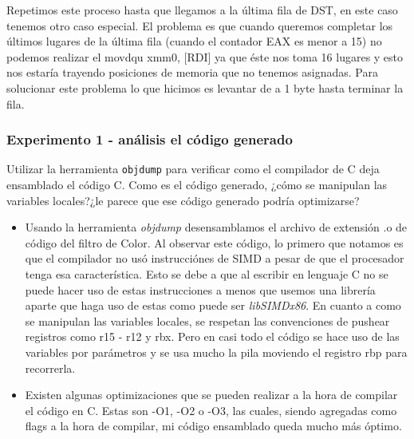 Repetimos este proceso hasta que llegamos a la última fila de DST, en este caso tenemos otro caso especial. \newline
El problema es que cuando queremos completar los últimos lugares de la última fila (cuando el contador EAX es menor a 15)
no podemos realizar el movdqu xmm0, [RDI] ya que éste nos toma 16 lugares y esto nos estaría trayendo posiciones de memoria
que no tenemos asignadas. Para solucionar este problema lo que hicimos es levantar de a 1 byte hasta terminar la fila. \newline


\vspace*{0.3cm} \noindent
\subsubsection{Experimento 1 - análisis el código generado}

Utilizar la herramienta \verb|objdump| para verificar como el compilador de C deja ensamblado el código C. Como es el código generado, ¿cómo se manipulan las variables locales?¿le parece que ese código generado podría optimizarse?
\vspace*{0.3cm} \noindent
\begin{itemize}
 \item Usando la herramienta \emph{objdump} desensamblamos el archivo de extensi\'on .o de c\'odigo del filtro de Color. Al observar este c\'odigo, lo primero que notamos es
 que el compilador no us\'o instrucci\'ones de SIMD a pesar de que el procesador tenga esa caracter\'istica. Esto se debe a que al escribir en lenguaje C
no se puede hacer uso de estas instrucciones a menos que usemos una librer\'ia aparte que haga uso de estas como puede ser \emph{libSIMDx86}.\newline
En cuanto a como se manipulan las variables locales, se respetan las convenciones de pushear registros como r15 - r12 y rbx. Pero en casi todo el c\'odigo
se hace uso de las variables por par\'ametros y se usa mucho la pila moviendo el registro rbp para recorrerla.\newline
\item Existen algunas optimizaciones que se pueden realizar a la hora de compilar el c\'odigo en C. Estas son -O1, -O2 o -O3, las cuales, siendo agregadas
como flags a la hora de compilar, mi c\'odigo ensamblado queda mucho m\'as \'optimo. 
\end{itemize}

\vspace*{0.3cm} \noindent

